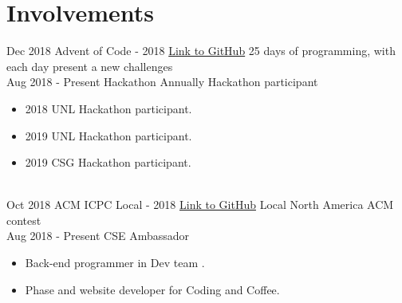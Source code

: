 \documentclass[letterpaper]{twentysecondcv} %
\begin{document}
\section{Involvements}
\begin{twenty}
	\twentyitem
    	{Dec 2018}
		{}
        {Advent of Code - 2018}
        {\href{https://github.com/HuyNVuong/AdventOfCode}{Link to GitHub}}
        {}
        {
        25 days of programming, with each day present a new challenges
        {}
        }
    \\
    \twentyitem
    	{Aug 2018}
		{- Present}
        {Hackathon}
        {}
        {Annually Hackathon participant}
        {
        {\begin{itemize}
        \item 2018 UNL Hackathon participant.
        \item 2019 UNL Hackathon participant.
        \item 2019 CSG Hackathon participant.
		\end{itemize}}
        }
    \\
    \twentyitem
    	{Oct 2018}
		{}
        {ACM ICPC Local - 2018}
        {\href{https://github.com/HuyNVuong/ACM-2018}{Link to GitHub}}
        {}
        {
        Local North America ACM contest
        {}
        }
    \\
    \twentyitem
    	{Aug 2018}
		{- Present}
        {CSE Ambassador}
        {}
        {}
        {
        {\begin{itemize}
        \item Back-end programmer in Dev team .
        \item Phase and website developer for Coding and Coffee.
		\end{itemize}}
        }
\end{twenty}

\end{document}
